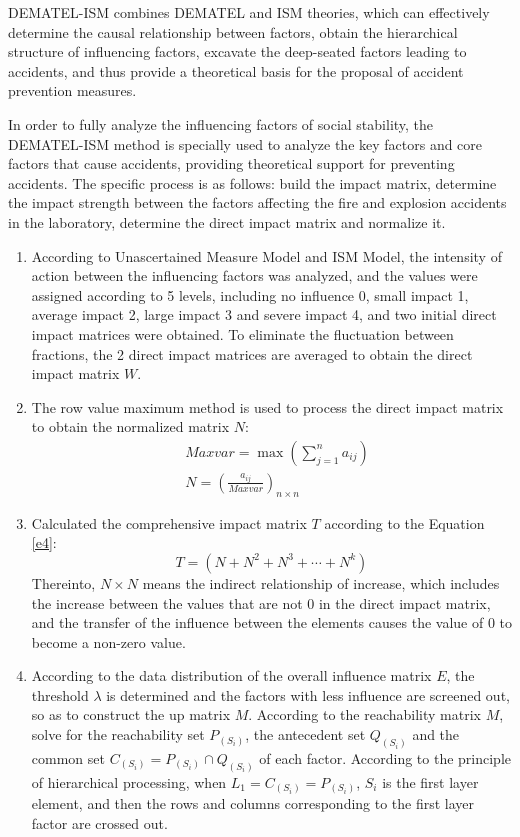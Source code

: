 \documentclass[12pt]{article}  %
\begin{document}
DEMATEL-ISM combines DEMATEL and ISM theories, which can effectively determine the causal relationship between factors, obtain the hierarchical structure of influencing factors, excavate the deep-seated factors leading to accidents, and thus provide a theoretical basis for the proposal of accident prevention measures.

In order to fully analyze the influencing factors of social stability, the DEMATEL-ISM method is specially used to analyze the key factors and core factors that cause accidents, providing theoretical support for preventing accidents. The specific process is as follows: build the impact matrix, determine the impact strength between the factors affecting the fire and explosion accidents in the laboratory, determine the direct impact matrix and normalize it. 
\begin{enumerate}
    \renewcommand{\labelenumi}{\textbf{Step \theenumi}}
\item According to Unascertained Measure Model and ISM Model, the intensity of action between the influencing factors was analyzed, and the values were assigned according to 5 levels, including no influence 0, small impact 1, average impact 2, large impact 3 and severe impact 4, and two initial direct impact matrices were obtained. To eliminate the fluctuation between fractions, the 2 direct impact matrices are averaged to obtain the direct impact matrix $W$.
\item The row value maximum method is used to process the direct impact matrix to obtain the normalized matrix $N$:
\begin{eqnarray}
	&Maxvar=\max (\sum_{j=1}^{n}a_{ij})\\
	&N=(\frac{a_{ij}}{Maxvar})_{n\times n}
\end{eqnarray}
\item Calculated the comprehensive impact matrix $T$ according to the Equation \ref{e4}:
\begin{equation}
	T=(N+N^2+N^3+\cdots +N^k)\label{e4}
\end{equation}
Thereinto, $N\times N$ means the indirect relationship of increase, which includes the increase between the values that are not 0 in the direct impact matrix, and the transfer of the influence between the elements causes the value of 0 to become a non-zero value.
\item According to the data distribution of the overall influence matrix $E$, the threshold $\lambda$ is determined and the factors with less influence are screened out, so as to construct the up matrix $M$. According to the reachability matrix $M$, solve for the reachability set $P_{(S_i)}$, the antecedent set $Q_{(S_i)}$ and the common set $C_{(S_i)}=P_{(S_i)}\cap Q_{(S_i)}$ of each factor. According to the principle of hierarchical processing, when $L_1=C_{(S_i)}=P_{(S_i)}$, $S_i$ is the first layer element, and then the rows and columns corresponding to the first layer factor are crossed out.

\end{enumerate}
\end{document}
